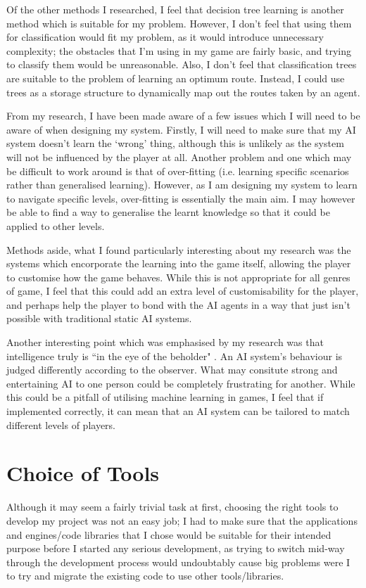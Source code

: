 \documentclass[a4paper,oneside]{report}
\begin{document}
Of the other methods I researched, I feel that decision tree learning is another method which is suitable for my problem. However, I don't feel that using them for classification would fit my problem, as it would introduce unnecessary complexity; the obstacles that I'm using in my game are fairly basic, and trying to classify them would be unreasonable. Also, I don't feel that classification trees are suitable to the problem of learning an optimum route. Instead, I could use trees as a storage structure to dynamically map out the routes taken by an agent.

From my research, I have been made aware of a few issues which I will need to be aware of when designing my system. Firstly, I will need to make sure that my AI system doesn't learn the `wrong' thing, although this is unlikely as the system will not be influenced by the player at all. Another problem and one which may be difficult to work around is that of over-fitting (i.e. learning specific scenarios rather than generalised learning). However, as I am designing my system to learn to navigate specific levels, over-fitting is essentially the main aim. I may however be able to find a way to generalise the learnt knowledge so that it could be applied to other levels. 

Methods aside, what I found particularly interesting about my research was the systems which encorporate the learning into the game itself, allowing the player to customise how the game behaves. While this is not appropriate for all genres of game, I feel that this could add an extra level of customisability for the player, and perhaps help the player to bond with the AI agents in a way that just isn't possible with traditional static AI systems.

Another interesting point which was emphasised by my research was that intelligence truly is ``in the eye of the beholder" \cite{:hc}. An AI system's behaviour is judged differently according to the observer. What may consitute strong and entertaining AI to one person could be completely frustrating for another. While this could be a pitfall of utilising machine learning in games, I feel that if implemented correctly, it can mean that an AI system can be tailored to match different levels of players.
	
\chapter{Choice of Tools}

Although it may seem a fairly trivial task at first, choosing the right tools to develop my project was not an easy job; I had to make sure that the applications and engines/code libraries that I chose would be suitable for their intended purpose before I started any serious development, as trying to switch mid-way through the development process would undoubtably cause big problems were I to try and migrate the existing code to use other tools/libraries.
\end{document}
